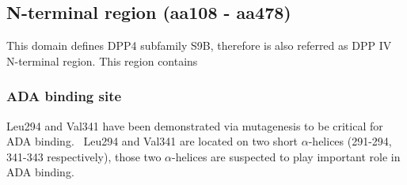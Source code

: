 \subsection{N-terminal region (aa108 - aa478)}

This domain defines DPP4 subfamily S9B, therefore is also referred as DPP IV N-terminal region. This region contains 

\subsubsection{ADA binding site}
Leu294 and Val341 have been demonstrated via mutagenesis to be critical for ADA binding.~\cite{Abbott_1999} Leu294 and Val341 are located on two short $\alpha$-helices (291-294, 341-343 respectively), those two $\alpha$-helices are suspected to play important role in ADA binding. 